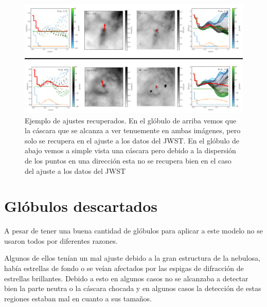 \documentclass{book}
\begin{document}
\begin{figure}[htb]
    \centering
    \includegraphics[width=\textwidth]{Nuevas imagenes finales/C4_Recuperados_ajustes.pdf}
    \caption{Ejemplo de ajustes recuperados. En el glóbulo de arriba vemos que la cáscara que se alcanza a ver tenuemente en ambas imágenes, pero solo se recupera en el ajuste a los datos del JWST. En el glóbulo de abajo vemos a simple vista una cáscara pero debido a la dispersión de los puntos en una dirección esta no se recupera bien en el caso del ajuste a los datos del JWST}
    \label{Recuperados Globulos}
\end{figure}

\section{Glóbulos descartados}\label{Bad globules}

A pesar de tener una buena cantidad de glóbulos para aplicar a este modelo no se usaron todos por diferentes razones. 

Algunos de ellos tenían un mal ajuste debido a la gran estructura de la nebulosa, había estrellas de fondo o se veían afectados por las espigas de difracción de estrellas brillantes.  Debido a esto en algunos casos no se alcanzaba a detectar bien la parte neutra o la cáscara chocada y en algunos casos la detección de estas regiones estaban mal en cuanto a sus tamaños.  
\end{document}
